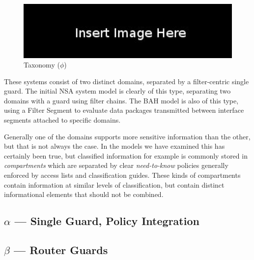 \documentclass[12pt,letterpaper]{article}
\begin{document}
\begin{figure}[!t]
\centering
\includegraphics[width=5in]{blank}
\caption{Taxonomy ($\phi$)}
\label{fig:model:taxonomy-phi}
\end{figure}

These systems consist of two distinct domains, separated by a filter-centric single guard.  The initial NSA system model is clearly of this type, separating two domains with a guard using filter chains.  The BAH model is also of this type, using a Filter Segment to evaluate data packages transmitted between interface segments attached to specific domains.

Generally one of the domains supports more sensitive information than the other, but that is not always the case.  In the models we have examined this has certainly been true, but classified information for example  is commonly stored in \textit{compartments} which are separated by clear \textit{need-to-know} policies generally enforced by access lists and classification guides.  These kinds of compartments contain information at similar levels of classification, but contain distinct informational elements that should not be combined.

\subsection{$\alpha$ --- Single Guard, Policy Integration}


\subsection{$\beta$ --- Router Guards}

\end{document}
